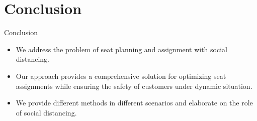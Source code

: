 
\section{Conclusion}
\frame{\sectionpage}

\begin{frame}{Conclusion}
    \begin{itemize}
        \item We address the problem of seat planning and assignment with social distancing.
        
        \item Our approach provides a comprehensive solution for optimizing seat assignments while ensuring the safety of customers under dynamic situation.

        \item We provide different methods in different scenarios and elaborate on the role of social distancing.
    \end{itemize}
\end{frame}
